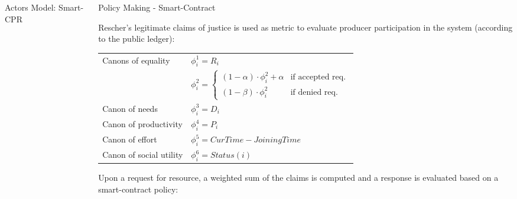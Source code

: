 \documentclass[xcolor={table}]{beamer}
\begin{document}
\begin{frame}[fragile=singleslide,t]
\begin{columns}[onlytextwidth,T]
\begin{column}{.48\textwidth}
\begin{block}{Actors Model: Smart-CPR}
\end{block}

\end{column}


\begin{column}{.48\textwidth}


\begin{block}{Policy Making - Smart-Contract}

Rescher's legitimate claims of justice is used as metric to evaluate producer participation in the system (according to the public ledger): 

\begin{table}
\renewcommand{\arraystretch}{1}
\color{black}
\small
\centering
\label{claims}
\begin{tabular}{|l|l|}
\hline
\multicolumn{1}{|l|}{\multirow{2}{*}{Canons of equality}} &  $\phi_{i}^{1} = R_i$ \\ \cline{2-2} 
\multicolumn{1}{|l|}{}                               &  $\phi_{i}^{2} = 
                                                          \begin{cases} 
                                                          (1 - \alpha) \cdot \phi_{i}^{2} +  \alpha & \text{if accepted req.}\\
                                                          (1 - \beta) \cdot \phi_{i}^{2} & \text{if denied req.}
                                                        \end{cases}$ \\ \hline
Canon of needs                                       &  $\phi_{i}^{3} = D_i$ \\ \hline
Canon of productivity                                &  $\phi_{i}^{4} = P_i$ \\ \hline
Canon of effort                                      &  $\phi_{i}^{5} = \mathit{CurTime} - \mathit{JoiningTime}$ \\ \hline
  Canon of social utility                              &  $\phi_{i}^{6} = \mathit{Status}(i)$\\ \hline
\end{tabular}
\end{table}



\renewcommand{\algorithmicrequire}{\textbf{Require:}}

\algrenewcommand{}

Upon a request for resource, a weighted sum of the claims is computed and a response is evaluated based on a smart-contract policy:


\end{block}
\end{column}
\end{columns}
\end{frame}
\end{document}
